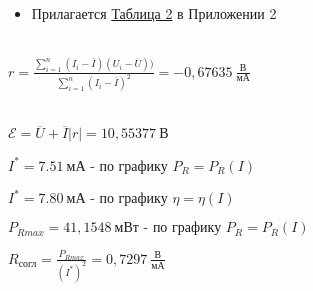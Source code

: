 \begin{itemize}
    \item Прилагается \hyperlink{table2}{Таблица 2} в Приложении 2
\end{itemize}

 \\
    
    $r = \frac{\sum\limits_{i=1}^{n}(I_i - \overline{I})(U_i - \overline{U}))}{\sum\limits_{i=1}^{n}(I_i - \overline{I})^2} = -0,67635 \ \frac{\text{В}}{\text{мА}}$

    \smallvspace

     \\
    
    $\mathcal{E} = \overline{U} + \overline{I}|r| = 10,55377 \ \text{В}$

    \newpage


    $I^* = 7.51 \ \text{мА  - по графику } P_R = P_R(I)$

    $I^* = 7.80 \ \text{мА  - по графику } \eta = \eta(I)$

    \smallvspace


    $P_{R max} = 41,1548 \ \text{мВт - по графику } P_R = P_R(I)$

    \smallvspace


    $R_{\text{согл}} = \frac{P_{R max}}{(I^*)^2} = 0,7297 \ \frac{\text{В}}{\text{мА}}$